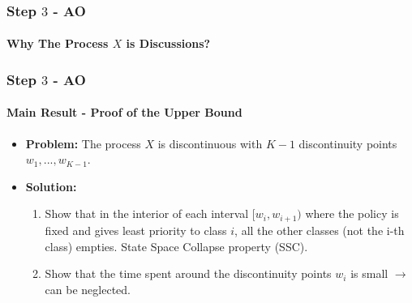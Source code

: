 \documentclass{beamer}
\begin{document}
\begin{frame}
\frametitle{Step $3$ - AO}
   \framesubtitle{Why The Process $X$ is Discussions?}
  \vfill
\end{frame}

\begin{frame}
\frametitle{Step $3$ - AO}
  \framesubtitle{Main Result - Proof of the Upper Bound}

  \vfill
  \begin{itemize}[<+->]
  \item {\bf Problem:} The process $X$ is discontinuous with $K-1$ discontinuity points $w_1,...,w_{K-1}$.
    \vfill
  \item {\bf Solution:}
    \begin{enumerate}[<+->]%
    \item Show that in the interior of each interval $[w_i,w_{i+1})$ where the policy is fixed and gives least priority to class $i$, all the other classes (not the i-th class) empties. State Space Collapse property (SSC).
      \vfill
    \item  Show that the time spent around the discontinuity points $w_i$ is small $\rightarrow$ can be neglected. 

    \end{enumerate}
  \end{itemize}
  \vfill
\end{frame}
\end{document}
